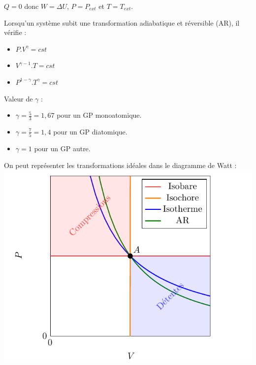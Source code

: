 \documentclass[11pt]{article}
\theoremstyle{cstyle}{\newtheorem{definition}{Définition}[section]}
\theoremstyle{cstyle}{\newtheorem{proposition}[definition]{Propriété}}
\theoremstyle{cstyle}{\newtheorem{theorem}[definition]{Théorème}}
\theoremstyle{mystyle}{\newtheorem{lemma}[definition]{Lemme}}
\theoremstyle{mystyle}{\newtheorem{corollary}[definition]{Corollaire}}
\theoremstyle{mystyle}{\newtheorem*{remark}{Remarque}}
\theoremstyle{mystyle}{\newtheorem*{remarks}{Remarques}}
\theoremstyle{mystyle}{\newtheorem*{example}{Exemple}}
\theoremstyle{mystyle}{\newtheorem*{examples}{Exemples}}
\theoremstyle{definition}{\newtheorem*{exercise}{Exercice}}
\theoremstyle{mystyle}{\newtheorem*{methode}{Méthode}}
\theoremstyle{cstyle}{\newtheorem*{cthm}{}}
\theoremstyle{warn}
\begin{document}
	\begin{minipage}[t]{0.45\textwidth}
		\begin{definition}
			\(Q = 0\) donc \(W = \Delta U\), \(P = P_{ext}\) et \(T = T_{ext}\).
		\end{definition}
		
		\begin{proposition}
			Lorsqu'un système subit une transformation adiabatique et réversible (AR), il vérifie :
			\begin{itemize}
				\item \(P.V^{\gamma} = cst\)
				\item \(V^{\gamma - 1}.T = cst\)
				\item \(P^{1 - \gamma}.T^{\gamma} = cst\)
			\end{itemize}
			
			Valeur de \(\gamma\) :
			\begin{itemize}
				\item \(\gamma = \frac{5}{3} = 1,67\) pour un GP monoatomique.
				\item \(\gamma = \frac{7}{5} = 1,4\) pour un GP diatomique.
				\item \(\gamma = 1\) pour un GP autre.
			\end{itemize}
		\end{proposition}
	
		\begin{proposition}
			On peut représenter les transformations idéales dans le diagramme de Watt :
			\includegraphics[width = \textwidth]{schema1.png}
		\end{proposition}
	\end{minipage}
	
	
\end{document}
